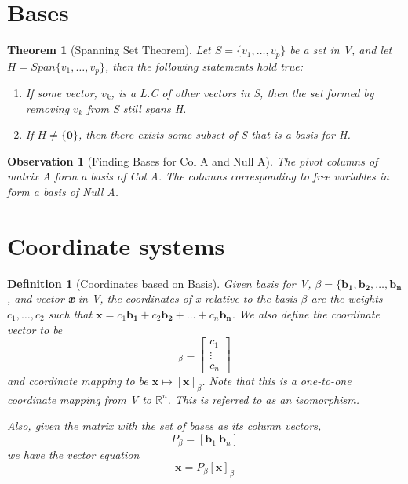 \documentclass[12pt]{report}
\newtheorem{thm}{Theorem}
\newtheorem{dfn}{Definition}
\newtheorem{obs}{Observation}
\begin{document}
\section{Bases}

\begin{thm}[Spanning Set Theorem]

Let $S=\{v_1,\ldots,v_p\}$ be a set in V, and let $H=Span\{v_1,\ldots,v_p\}$, then the following statements hold true:

\begin{enumerate}

\item If some vector, $v_k$, is a L.C of other vectors in S, then the set formed by removing $v_k$ from S still spans H.
\item If $H \neq \{\bm{0}\}$, then there exists some subset of S that is a basis for H.

\end{enumerate}
\end{thm}

\begin{obs}[Finding Bases for Col A and Null A]

The pivot columns of matrix A form a basis of Col A. The columns corresponding to free variables in form a basis of Null A.

\end{obs}

\section{Coordinate systems}

\begin{dfn}[Coordinates based on Basis]

Given basis for V, $\beta = \{\bm{b_1}, \bm{b_2}, \ldots, \bm{b_n}$, and vector \textbf{x} in V, the coordinates of x relative to the basis $\beta$ are the weights $c_1,\ldots,c_2$ such that $\bm{x}=c_1\bm{b_1}+c_2\bm{b_2}+\ldots+c_n\bm{b_n}$. We also define the coordinate vector to be
\begin{equation}
[\bm{x}]_\beta = \begin{bmatrix}c_1 \\ \vdots \\ c_n\end{bmatrix}
\end{equation}
and coordinate mapping to be $\bm{x} \mapsto [\bm{x}]_\beta$. Note that this is a one-to-one coordinate mapping from V to $\mathbb{R}^n$. This is referred to as an isomorphism.

Also, given the matrix with the set of bases as its column vectors,
\begin{equation}
P_\beta = [\bm{b}_1\:\bm{b}_n]
\end{equation}
we have the vector equation
\begin{equation}
\bm{x}=P_\beta [\bm{x}]_\beta
\end{equation}

\end{dfn}
\end{document}
